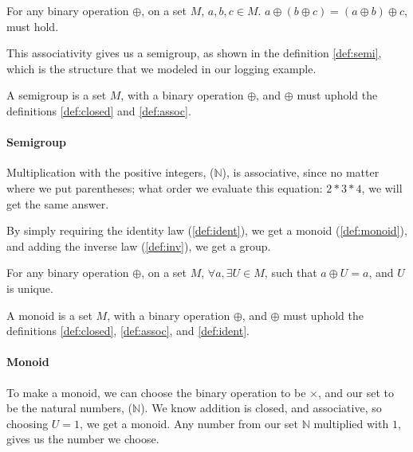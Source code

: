 \begin{definition} \label{def:assoc}
  For any binary operation $\oplus$, on a set $M$, $a, b, c \in M$.
  $a \oplus \left ( b \oplus c \right ) = \left ( a \oplus b \right ) \oplus c$,
  must hold.
\end{definition}

This associativity gives us a semigroup, as shown in the definition
\ref{def:semi}, which is the structure that we modeled in our logging example.

\begin{definition}[Semigroup] \label{def:semi}
  A semigroup is a set $M$, with a binary operation $\oplus$, and $\oplus$ must
  uphold the definitions \ref{def:closed} and \ref{def:assoc}.
\end{definition}

\paragraph{Semigroup} Multiplication with the positive integers, ($\mathbb{N}$), is
  associative, since no matter where we put parentheses; what order we
  evaluate this equation: $2 * 3 * 4$, we will get the same answer.

By simply requiring the identity law (\ref{def:ident}), we get a
monoid (\ref{def:monoid}), and adding the inverse law
(\ref{def:inv}), we get a group.

\begin{definition} \label{def:ident}
  For any binary operation $\oplus$, on a set $M$,
  $\forall a, \exists U \in M$, such that
  $a \oplus U = a$, and $U$ is unique.
\end{definition}

\begin{definition}[Monoid] \label{def:monoid}
  A monoid is a set $M$, with a binary operation $\oplus$, and $\oplus$ must
  uphold the definitions \ref{def:closed}, \ref{def:assoc}, and \ref{def:ident}.
\end{definition}

\paragraph{Monoid} To make a monoid, we can choose the binary operation to be
  $\times$, and our set to be the natural numbers, ($\mathbb{N}$). We know addition
  is closed, and associative, so choosing $U = 1$, we get a monoid. Any number
  from our set $\mathbb{N}$ multiplied with $1$, gives us the number we choose.

